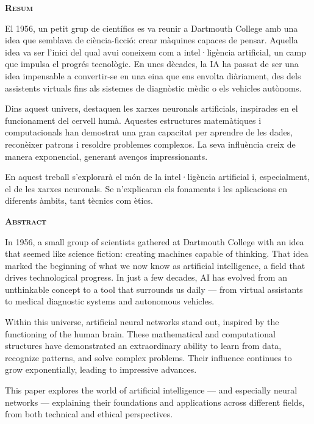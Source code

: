 

\begin{modernquote}
\textsc{\textbf{Resum}}\par
{}
\raggedright
El 1956, un petit grup de científics es va reunir a Dartmouth College amb una idea que semblava de ciència-ficció: crear màquines capaces de pensar. Aquella idea va ser l'inici del qual avui coneixem com a intel·ligència artificial, un camp que impulsa el progrés tecnològic. En unes dècades, la IA ha passat de ser una idea impensable a convertir-se en una eina que ens envolta diàriament, des dels assistents virtuals fins als sistemes de diagnòstic mèdic o els vehicles autònoms.\par

Dins aquest univers, destaquen les xarxes neuronals artificials, inspirades en el funcionament del cervell humà. Aquestes estructures matemàtiques i computacionals han demostrat una gran capacitat per aprendre de les dades, reconèixer patrons i resoldre problemes complexos. La seva influència creix de manera exponencial, generant avenços impressionants.\par

En aquest treball s'explorarà el món de la intel·ligència artificial i, especialment, el de les xarxes neuronals. Se n'explicaran els fonaments i les aplicacions en diferents àmbits, tant tècnics com ètics.
\end{modernquote}

\bigskip

\begin{modernquote}
\textsc{\textbf{Abstract}}\par
{}
\raggedright
In 1956, a small group of scientists gathered at Dartmouth College with an idea that seemed like science fiction: creating machines capable of thinking. That idea marked the beginning of what we now know as artificial intelligence, a field that drives technological progress. In just a few decades, AI has evolved from an unthinkable concept to a tool that surrounds us daily — from virtual assistants to medical diagnostic systems and autonomous vehicles.\par

Within this universe, artificial neural networks stand out, inspired by the functioning of the human brain. These mathematical and computational structures have demonstrated an extraordinary ability to learn from data, recognize patterns, and solve complex problems. Their influence continues to grow exponentially, leading to impressive advances.\par

This paper explores the world of artificial intelligence — and especially neural networks — explaining their foundations and applications across different fields, from both technical and ethical perspectives.
\end{modernquote}


